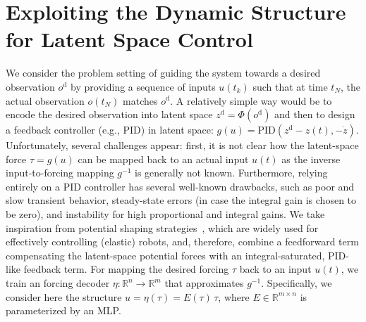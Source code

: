 \section{Exploiting the Dynamic Structure for Latent Space Control}\label{sec:con:latent_space_control}

We consider the problem setting of guiding the system towards a desired observation $o^\mathrm{d}$ by providing a sequence of inputs $u(t_k)$ such that at time $t_N$, the actual observation $o(t_N)$ matches $o^\mathrm{d}$.
A relatively simple way would be to encode the desired observation into latent space $z^\mathrm{d} = \Phi(o^\mathrm{d})$ and then to design a feedback controller (e.g., PID) in latent space: $g(u) = \mathrm{PID}(z^\mathrm{d}-z(t), -\dot{z})$.
Unfortunately, several challenges appear: first, it is not clear how the latent-space force $\tau = g(u)$ can be mapped back to an actual input $u(t)$ as the inverse input-to-forcing mapping $g^{-1}$ is generally not known.
Furthermore, relying entirely on a PID controller has several well-known drawbacks, such as poor and slow transient behavior, steady-state errors (in case the integral gain is chosen to be zero), and instability for high proportional and integral gains.
We take inspiration from potential shaping strategies~\cite{bloch2001controlled, ortega2021pid}, which are widely used for effectively controlling (elastic) robots, and, therefore, combine a feedforward term compensating the latent-space potential forces with an integral-saturated, PID-like feedback term. For mapping the desired forcing $\tau$ back to an input $u(t)$, we train an forcing decoder $\eta: \mathbb{R}^{n} \to \mathbb{R}^{m}$ that approximates $g^{-1}$. Specifically, we consider here the structure $u = \eta(\tau) = E(\tau) \, \tau$, where $E \in \mathbb{R}^{m \times n}$ is parameterized by an \gls{MLP}.

